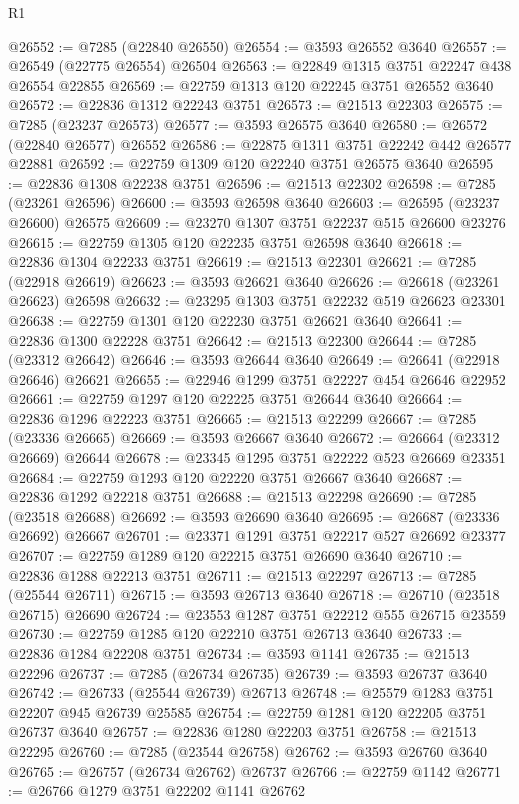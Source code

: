 \begin{lexlean}{R1}
\begin{coremodule}
@26552 := @7285 (@22840 @26550)
@26554 := @3593 @26552 @3640
@26557 := @26549 (@22775 @26554) @26504
@26563 := @22849 @1315 @3751 @22247 @438 @26554 @22855
@26569 := @22759 @1313 @120 @22245 @3751 @26552 @3640
@26572 := @22836 @1312 @22243 @3751
@26573 := @21513 @22303
@26575 := @7285 (@23237 @26573)
@26577 := @3593 @26575 @3640
@26580 := @26572 (@22840 @26577) @26552
@26586 := @22875 @1311 @3751 @22242 @442 @26577 @22881
@26592 := @22759 @1309 @120 @22240 @3751 @26575 @3640
@26595 := @22836 @1308 @22238 @3751
@26596 := @21513 @22302
@26598 := @7285 (@23261 @26596)
@26600 := @3593 @26598 @3640
@26603 := @26595 (@23237 @26600) @26575
@26609 := @23270 @1307 @3751 @22237 @515 @26600 @23276
@26615 := @22759 @1305 @120 @22235 @3751 @26598 @3640
@26618 := @22836 @1304 @22233 @3751
@26619 := @21513 @22301
@26621 := @7285 (@22918 @26619)
@26623 := @3593 @26621 @3640
@26626 := @26618 (@23261 @26623) @26598
@26632 := @23295 @1303 @3751 @22232 @519 @26623 @23301
@26638 := @22759 @1301 @120 @22230 @3751 @26621 @3640
@26641 := @22836 @1300 @22228 @3751
@26642 := @21513 @22300
@26644 := @7285 (@23312 @26642)
@26646 := @3593 @26644 @3640
@26649 := @26641 (@22918 @26646) @26621
@26655 := @22946 @1299 @3751 @22227 @454 @26646 @22952
@26661 := @22759 @1297 @120 @22225 @3751 @26644 @3640
@26664 := @22836 @1296 @22223 @3751
@26665 := @21513 @22299
@26667 := @7285 (@23336 @26665)
@26669 := @3593 @26667 @3640
@26672 := @26664 (@23312 @26669) @26644
@26678 := @23345 @1295 @3751 @22222 @523 @26669 @23351
@26684 := @22759 @1293 @120 @22220 @3751 @26667 @3640
@26687 := @22836 @1292 @22218 @3751
@26688 := @21513 @22298
@26690 := @7285 (@23518 @26688)
@26692 := @3593 @26690 @3640
@26695 := @26687 (@23336 @26692) @26667
@26701 := @23371 @1291 @3751 @22217 @527 @26692 @23377
@26707 := @22759 @1289 @120 @22215 @3751 @26690 @3640
@26710 := @22836 @1288 @22213 @3751
@26711 := @21513 @22297
@26713 := @7285 (@25544 @26711)
@26715 := @3593 @26713 @3640
@26718 := @26710 (@23518 @26715) @26690
@26724 := @23553 @1287 @3751 @22212 @555 @26715 @23559
@26730 := @22759 @1285 @120 @22210 @3751 @26713 @3640
@26733 := @22836 @1284 @22208 @3751
@26734 := @3593 @1141
@26735 := @21513 @22296
@26737 := @7285 (@26734 @26735)
@26739 := @3593 @26737 @3640
@26742 := @26733 (@25544 @26739) @26713
@26748 := @25579 @1283 @3751 @22207 @945 @26739 @25585
@26754 := @22759 @1281 @120 @22205 @3751 @26737 @3640
@26757 := @22836 @1280 @22203 @3751
@26758 := @21513 @22295
@26760 := @7285 (@23544 @26758)
@26762 := @3593 @26760 @3640
@26765 := @26757 (@26734 @26762) @26737
@26766 := @22759 @1142
@26771 := @26766 @1279 @3751 @22202 @1141 @26762

\end{coremodule}
\end{lexlean}

